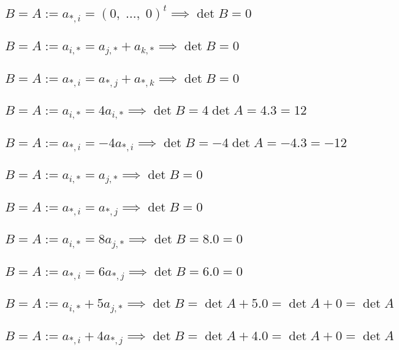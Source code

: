 \documentclass{article}
\begin{document}
    \subsection{\(B = A := a_{*,i} = (0, \; \dots, \; 0)^t \implies \det B = 0\)}
    \subsection{\(B = A := a_{i,*} = a_{j,*} + a_{k,*} \implies \det B = 0\)}
    \subsection{\(B = A := a_{*,i} = a_{*,j} + a_{*,k} \implies \det B = 0\)}
    \subsection{\(B = A := a_{i,*} = 4a_{i,*} \implies \det B = 4\det A = 4.3 = 12\)}
    \subsection{\(B = A := a_{*,i} = -4a_{*,i} \implies \det B = -4\det A = -4.3 = -12\)}
    \subsection{\(B = A := a_{i,*} = a_{j,*} \implies \det B = 0\)}
    \subsection{\(B = A := a_{*,i} = a_{*,j} \implies \det B = 0\)}
    \subsection{\(B = A := a_{i,*} = 8a_{j,*} \implies \det B = 8.0 = 0\)}
    \subsection{\(B = A := a_{*,i} = 6a_{*,j} \implies \det B = 6.0 = 0\)}
    \subsection{\(B = A := a_{i,*} + 5a_{j,*} \implies \det B = \det A + 5.0 = \det A + 0 = \det A\)}
    \subsection{\(B = A := a_{*,i} + 4a_{*,j} \implies \det B = \det A + 4.0 = \det A + 0 = \det A\)}
\end{document}
